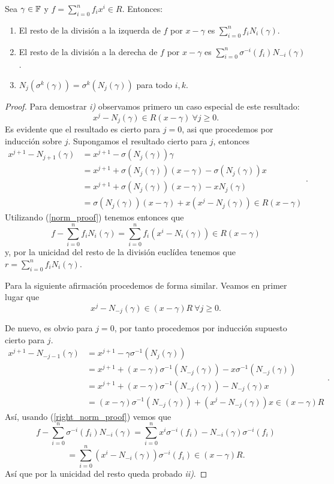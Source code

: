 \begin{lemma}
\label{lem:eval}
    Sea \(\gamma \in \mathbb{F}\) y  \(f = \sum_{i=0}^n f_ix^i \in R\). Entonces:
    \begin{enumerate}
    \item El resto de la división a la izquerda de \(f\) por  \(x - \gamma\) es  \(\sum_{i=0}^{n} f_i N_i(\gamma)\).
    \item El resto de la división a la derecha de \(f\) por  \(x - \gamma\) es  \(\sum_{i=0}^{n}\sigma^{-i}(f_i)N_{-i}(\gamma)\).
    \item \(N_j(\sigma^k(\gamma)) = \sigma^k(N_j(\gamma))\) para todo \(i,k\).
    \end{enumerate}
\end{lemma}
\begin{proof}
    Para demostrar \textit{i)} observamos primero un caso especial de este resultado:
\begin{equation}
\label{norm_proof}
    x^j - N_j(\gamma) \in R(x-\gamma)\ \forall j \geq 0.
\end{equation}
    Es evidente que el resultado es cierto para \(j = 0\), asi que procedemos por inducción sobre \(j\). Supongamos el resultado cierto para \(j\), entonces
\[
\begin{aligned}
x^{j+1} - N_{j+1}(\gamma) &= x^{j+1} - \sigma(N_j(\gamma))\gamma \\
&= x^{j+1} +  \sigma(N_j(\gamma))(x-\gamma) - \sigma(N_j(\gamma))x \\
&= x^{j+1} +  \sigma(N_j(\gamma))(x-\gamma) - xN_j(\gamma) \\
&= \sigma(N_j(\gamma))(x-\gamma) + x(x^{j} - N_j(\gamma)) \in R(x-\gamma)
\end{aligned}
.\]
Utilizando (\ref{norm_proof}) tenemos entonces que
\[
f - \sum_{i=0}^n f_i N_i(\gamma) = \sum_{i=0}^n f_i(x^i - N_i(\gamma)) \in R(x - \gamma)
\]
y, por la unicidad del resto de la división euclídea tenemos que \(r = \sum_{i=0}^n f_i N_i(\gamma)\).

Para la siguiente afirmación procedemos de forma similar. Veamos en primer lugar que
\begin{equation}
\label{right_norm_proof}
    x^j - N_{-j}(\gamma) \in (x-\gamma)R\ \forall j \geq 0.
\end{equation}

De nuevo, es obvio para \(j = 0\), por tanto procedemos por inducción supuesto cierto para \(j\).
\[
\begin{aligned}
x^{j+1} - N_{-j-1}(\gamma) &= x^{j+1} - \gamma\sigma^{-1}(N_j(\gamma))  \\
&= x^{j+1} +  (x-\gamma)\sigma^{-1}(N_{-j}(\gamma)) - x\sigma^{-1}(N_{-j}(\gamma)) \\
&= x^{j+1} + (x-\gamma)\sigma^{-1}(N_{-j}(\gamma)) - N_{-j}(\gamma)x \\
&= (x-\gamma)\sigma^{-1}(N_{-j}(\gamma)) + (x^{j} - N_{-j}(\gamma))x \in (x-\gamma)R
\end{aligned}
.\]
Así, usando (\ref{right_norm_proof}) vemos que
\[
f - \sum_{i=0}^n \sigma^{-i}(f_i) N_{-i}(\gamma) = \sum_{i=0}^n x^i\sigma^{-i}(f_i) - N_{-i}(\gamma)\sigma^{-i}(f_i)
\]
\[
= \sum_{i=0}^n (x^i - N_{-i}(\gamma))\sigma^{-i}(f_i) \in (x - \gamma)R
.\]
Así que por la unicidad del resto queda probado \textit{ii)}.


\end{proof}
